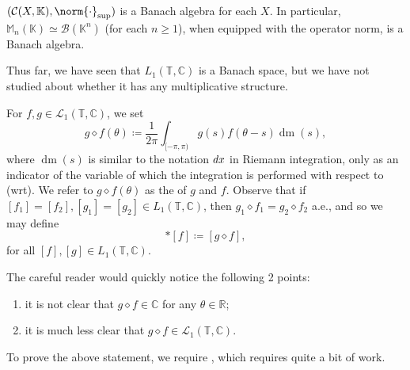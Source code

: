 \documentclass[notoc,notitlepage]{tufte-book}
\DeclareMathOperator{\dm}{dm}
\begin{document}
\begin{eg}
  $(\mathcal{C}(X, \mathbb{K}), \norm{\cdot}_{\sup})$
  is a Banach algebra for each  $X$.
  In particular, $\mathbb{M}_n(\mathbb{K}) \simeq \mathcal{B}(\mathbb{K}^n)$
  (for each $n \geq 1$), when equipped with the operator norm,
  is a Banach algebra.
\end{eg}

Thus far, we have seen that $L_1(\mathbb{T}, \mathbb{C})$ is a Banach space,
but we have not studied about whether it has any multiplicative structure.

For $f, g \in \mathcal{L}_1(\mathbb{T}, \mathbb{C})$, we set
\begin{equation*}
  g \diamond f(\theta) \coloneqq \frac{1}{2 \pi}
  \int_{[-\pi, \pi)} g(s) f(\theta - s) \dm(s),
\end{equation*}
where $\dm(s)$ is similar to the notation $\mathop{}\!d{x}$ in Riemann integration,
only as an indicator of the variable of which the integration is performed
with respect to (wrt).
We refer to $g \diamond f(\theta)$ as the  of $g$ and $f$.
Observe that if $[f_1] = [f_2], [g_1] = [g_2] \in L_1(\mathbb{T}, \mathbb{C})$,
then $g_1 \diamond f_1 = g_2 \diamond f_2$ a.e., and so we may define
\begin{equation*}
  [g] * [f] \coloneqq [g \diamond f],
\end{equation*}
for all $[f], [g] \in L_1(\mathbb{T}, \mathbb{C})$.

The careful reader would quickly notice the following 2 points:
\begin{enumerate}
  \item it is not clear that $g \diamond f \in \mathbb{C}$
    for any $\theta \in \mathbb{R}$;
  \item it is much less clear that $g \diamond f \in \mathcal{L}_1(\mathbb{T},
    \mathbb{C})$.
\end{enumerate}
To prove the above statement, we require ,
which requires quite a bit of work.
\end{document}
